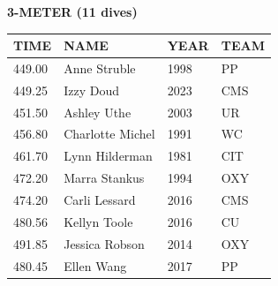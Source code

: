 \begin{table}[H]
\centering
\begin{minipage}[t]{0.6\textwidth}
\centering
\textbf{3-METER (11 dives)}\\[0.1cm]
\begin{tabular}{@{}p{1.8cm}p{2.8cm}p{1.2cm}p{1.4cm}@{}}
\hline
    \textbf{TIME} & \textbf{NAME} & \textbf{YEAR} & \textbf{TEAM} \\
\hline
    449.00 & Anne Struble & 1998 & PP \\
    449.25 & Izzy Doud & 2023 & CMS \\
    451.50 & Ashley Uthe & 2003 & UR \\
    456.80 & Charlotte Michel & 1991 & WC \\
    461.70 & Lynn Hilderman & 1981 & CIT \\
    472.20 & Marra Stankus & 1994 & OXY \\
    474.20 & Carli Lessard & 2016 & CMS \\
    480.56 & Kellyn Toole & 2016 & CU \\
    491.85 & Jessica Robson & 2014 & OXY \\
    480.45 & Ellen Wang & 2017 & PP \\
\hline
\end{tabular}
\end{minipage}
\end{table}


\newpage



